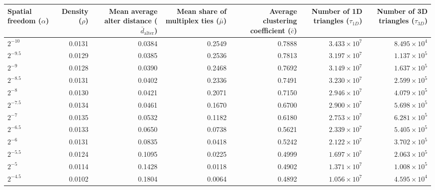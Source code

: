 \begin{table}
\label{tab:network_properties_by_alpha}
\begin{tabular}{lrrrrrr}
\toprule
\makecell{Spatial freedom\\($\alpha$)} & \makecell{Density\\($\rho$)} & \makecell{Mean average\\alter distance\\($\bar{d}_{\mathrm{alter}}$)} & \makecell{Mean share of\\multiplex ties\\($\bar{\mu}$)} & \makecell{Average clustering\\coefficient\\($\bar{c}$)} & \makecell{Number of\\1D triangles\\($\tau_{1D}$)} & \makecell{Number of\\3D triangles\\($\tau_{3D}$)} \\
\midrule
$2^{-10}$ & 0.0131 & 0.0384 & 0.2549 & 0.7888 & $3.433 \times 10^{7}$ & $8.495 \times 10^{4}$ \\
$2^{-9.5}$ & 0.0129 & 0.0385 & 0.2536 & 0.7813 & $3.197 \times 10^{7}$ & $1.137 \times 10^{5}$ \\
$2^{-9}$ & 0.0128 & 0.0390 & 0.2468 & 0.7692 & $3.149 \times 10^{7}$ & $1.637 \times 10^{5}$ \\
$2^{-8.5}$ & 0.0131 & 0.0402 & 0.2336 & 0.7491 & $3.230 \times 10^{7}$ & $2.599 \times 10^{5}$ \\
$2^{-8}$ & 0.0130 & 0.0421 & 0.2071 & 0.7150 & $2.946 \times 10^{7}$ & $4.079 \times 10^{5}$ \\
$2^{-7.5}$ & 0.0134 & 0.0461 & 0.1670 & 0.6700 & $2.900 \times 10^{7}$ & $5.698 \times 10^{5}$ \\
$2^{-7}$ & 0.0135 & 0.0532 & 0.1182 & 0.6180 & $2.753 \times 10^{7}$ & $6.281 \times 10^{5}$ \\
$2^{-6.5}$ & 0.0133 & 0.0650 & 0.0738 & 0.5621 & $2.339 \times 10^{7}$ & $5.405 \times 10^{5}$ \\
$2^{-6}$ & 0.0131 & 0.0835 & 0.0418 & 0.5242 & $2.122 \times 10^{7}$ & $3.702 \times 10^{5}$ \\
$2^{-5.5}$ & 0.0124 & 0.1095 & 0.0225 & 0.4999 & $1.697 \times 10^{7}$ & $2.063 \times 10^{5}$ \\
$2^{-5}$ & 0.0114 & 0.1428 & 0.0118 & 0.4902 & $1.371 \times 10^{7}$ & $1.008 \times 10^{5}$ \\
$2^{-4.5}$ & 0.0102 & 0.1804 & 0.0064 & 0.4892 & $1.056 \times 10^{7}$ & $4.595 \times 10^{4}$ \\

\end{tabular}
\end{table}
